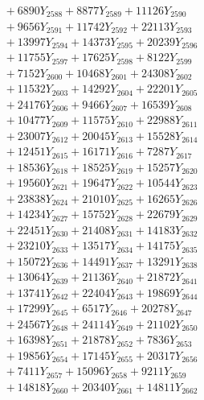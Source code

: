 \documentclass[a4paper,10pt]{article}
\begin{document}
{\begin{align}
&\;  + 6890 Y_{2588} + 8877 Y_{2589} + 11126 Y_{2590} \\[0.3ex]
&\;  + 9656 Y_{2591} + 11742 Y_{2592} + 22113 Y_{2593} \\[0.3ex]
&\;  + 13997 Y_{2594} + 14373 Y_{2595} + 20239 Y_{2596} \\[0.3ex]
&\;  + 11755 Y_{2597} + 17625 Y_{2598} + 8122 Y_{2599} \\[0.3ex]
&\;  + 7152 Y_{2600} + 10468 Y_{2601} + 24308 Y_{2602} \\[0.3ex]
&\;  + 11532 Y_{2603} + 14292 Y_{2604} + 22201 Y_{2605} \\[0.3ex]
&\;  + 24176 Y_{2606} + 9466 Y_{2607} + 16539 Y_{2608} \\[0.5ex]\allowbreak
&\;  + 10477 Y_{2609} + 11575 Y_{2610} + 22988 Y_{2611} \\[0.3ex]
&\;  + 23007 Y_{2612} + 20045 Y_{2613} + 15528 Y_{2614} \\[0.3ex]
&\;  + 12451 Y_{2615} + 16171 Y_{2616} + 7287 Y_{2617} \\[0.3ex]
&\;  + 18536 Y_{2618} + 18525 Y_{2619} + 15257 Y_{2620} \\[0.3ex]
&\;  + 19560 Y_{2621} + 19647 Y_{2622} + 10544 Y_{2623} \\[0.3ex]
&\;  + 23838 Y_{2624} + 21010 Y_{2625} + 16265 Y_{2626} \\[0.3ex]
&\;  + 14234 Y_{2627} + 15752 Y_{2628} + 22679 Y_{2629} \\[0.3ex]
&\;  + 22451 Y_{2630} + 21408 Y_{2631} + 14183 Y_{2632} \\[0.3ex]
&\;  + 23210 Y_{2633} + 13517 Y_{2634} + 14175 Y_{2635} \\[0.3ex]
&\;  + 15072 Y_{2636} + 14491 Y_{2637} + 13291 Y_{2638} \\[0.5ex]\allowbreak
&\;  + 13064 Y_{2639} + 21136 Y_{2640} + 21872 Y_{2641} \\[0.3ex]
&\;  + 13741 Y_{2642} + 22404 Y_{2643} + 19869 Y_{2644} \\[0.3ex]
&\;  + 17299 Y_{2645} + 6517 Y_{2646} + 20278 Y_{2647} \\[0.3ex]
&\;  + 24567 Y_{2648} + 24114 Y_{2649} + 21102 Y_{2650} \\[0.3ex]
&\;  + 16398 Y_{2651} + 21878 Y_{2652} + 7836 Y_{2653} \\[0.3ex]
&\;  + 19856 Y_{2654} + 17145 Y_{2655} + 20317 Y_{2656} \\[0.3ex]
&\;  + 7411 Y_{2657} + 15096 Y_{2658} + 9211 Y_{2659} \\[0.3ex]
&\;  + 14818 Y_{2660} + 20340 Y_{2661} + 14811 Y_{2662} \\[0.3ex]

\end{align}}
\end{document}
